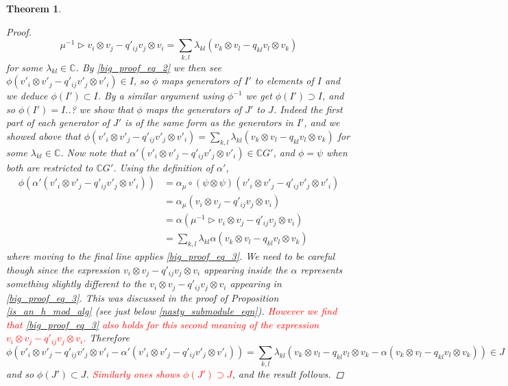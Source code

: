 \documentclass[10pt]{article}
\newcommand{\bb}{\medbreak}
\newcommand{\Cc }{\mathbb{C}}
\newtheorem{theorem}[lemma]{Theorem}
\theoremstyle{definition}
\begin{document}
\begin{theorem}
\begin{proof}
{\begin{equation}\label{big_proof_eq_3}
\mu^{-1}\rhd v_i\otimes v_j-q'_{ij}v_j\otimes v_i=\sum_{k,l}\lambda_{kl}(v_k\otimes v_l-q_{kl}v_l\otimes v_k)
\end{equation}
for some $\lambda_{kl}\in \Cc $. By \eqref{big_proof_eq_2} we then see $\phi(v'_i\otimes v'_j-q'_{ij}v'_j\otimes v'_i)\in I$, so $\phi$ maps generators of $I'$ to elements of $I$ and we deduce $\phi(I')\subset I$. By a similar argument using $\phi^{-1}$ we get $\phi(I')\supset I$, and so $\phi(I')=I$..?}\bb
we show that $\phi$ maps the generators of $J'$ to $J$. Indeed the first part of each generator of $J'$ is of the same form as the generators in $I'$, and we showed above that $\phi(v'_i\otimes v'_j-q'_{ij}v'_j\otimes v'_i)=\sum_{k,l}\lambda_{kl}(v_k\otimes v_l-q_{kl}v_l\otimes v_k)$ for some $\lambda_{kl}\in \Cc $. Now note that $\alpha'(v'_i\otimes v'_j-q'_{ij}v'_j\otimes v'_i)\in \Cc  G'$, and $\phi=\psi$ when both are restricted to $\Cc  G'$. Using the definition of $\alpha'$, 
\begin{align*}
\phi(\alpha'(v'_i\otimes v'_j-q'_{ij}v'_j\otimes v'_i))& =\alpha_\mu\circ (\psi\otimes \psi)(v'_i\otimes v'_j-q'_{ij}v'_j\otimes v'_i)\\
& = \alpha_\mu(v_i\otimes v_j-q'_{ij}v_j\otimes v_i)\\
& = \alpha(\mu^{-1}\rhd v_i\otimes v_j-q'_{ij}v_j\otimes v_i)\\
& = \sum_{k,l}\lambda_{kl}\alpha(v_k\otimes v_l-q_{kl}v_l\otimes v_k)
\end{align*}
where moving to the final line applies \eqref{big_proof_eq_3}. We need to be careful though since the expression $v_i\otimes v_j-q'_{ij}v_j\otimes v_i$ appearing inside the $\alpha$ represents something slightly different to the $v_i\otimes v_j-q'_{ij}v_j\otimes v_i$ appearing in \eqref{big_proof_eq_3}. This was discussed in the proof of Proposition \ref{is_an_h_mod_alg} (see just below \eqref{nasty_submodule_eqn}). \textcolor{red}{However we find that \eqref{big_proof_eq_3} also holds for this second meaning of the expression $v_i\otimes v_j-q'_{ij}v_j\otimes v_i$.} Therefore
$$\phi(v'_i\otimes v'_j-q'_{ij}v'_j\otimes v'_i-\alpha'(v'_i\otimes v'_j-q'_{ij}v'_j\otimes v'_i))=\sum_{k,l}\lambda_{kl}(v_k\otimes v_l-q_{kl}v_l\otimes v_k-\alpha(v_k\otimes v_l-q_{kl}v_l\otimes v_k))\in J$$
and so $\phi(J')\subset J$. \textcolor{red}{Similarly ones shows $\phi(J')\supset J$}, and the result follows.
\end{proof}
\end{theorem}
\end{document}
